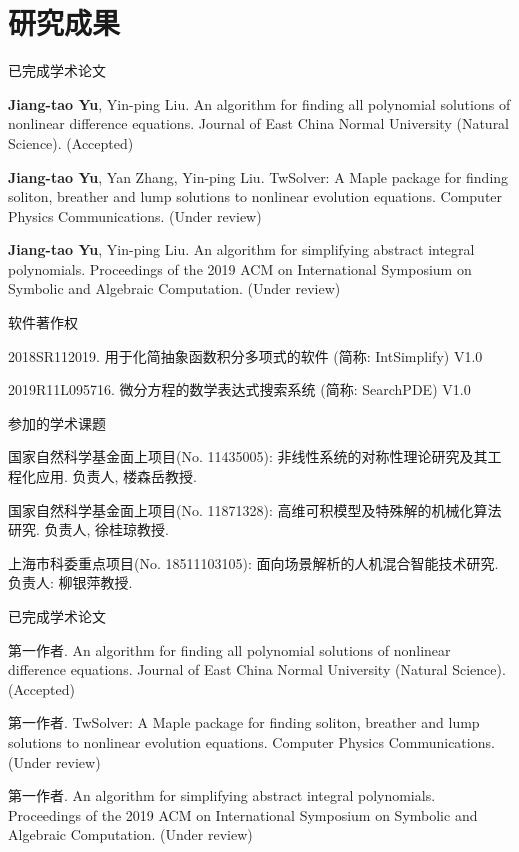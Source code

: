 \chapter*{研究成果}

\ifdefined\RELESE %

\noindent 已完成学术论文
\begin{enumerate}[label={[\arabic*]},leftmargin=*]
\item {\bf Jiang-tao Yu}, Yin-ping Liu. An algorithm for finding all polynomial
solutions of nonlinear difference equations. Journal of East China Normal University (Natural Science). (Accepted)
\item {\bf Jiang-tao Yu}, Yan Zhang, Yin-ping Liu. TwSolver: A Maple package for finding soliton, breather and lump solutions to nonlinear evolution equations. Computer Physics Communications. (Under review)
\item {\bf Jiang-tao Yu}, Yin-ping Liu. An algorithm for simplifying abstract integral polynomials. Proceedings of the 2019 ACM on International Symposium on Symbolic and Algebraic Computation. (Under review)
\end{enumerate}

\noindent 软件著作权
\begin{enumerate}[label={[\arabic*]},leftmargin=*]
\item 2018SR112019. 用于化简抽象函数积分多项式的软件 (简称: IntSimplify) V1.0
\item 2019R11L095716. 微分方程的数学表达式搜索系统 (简称: SearchPDE) V1.0
\end{enumerate}

\noindent 参加的学术课题
\begin{enumerate}[label={[\arabic*]},leftmargin=*]
\item 国家自然科学基金面上项目(No. 11435005): 非线性系统的对称性理论研究及其工程化应用. 负责人, 楼森岳教授.
\item 国家自然科学基金面上项目(No. 11871328): 高维可积模型及特殊解的机械化算法研究. 负责人, 徐桂琼教授.
\item 上海市科委重点项目(No. 18511103105): 面向场景解析的人机混合智能技术研究. 负责人: 柳银萍教授.
\end{enumerate}

\else %

\noindent 已完成学术论文
\begin{enumerate}[label={[\arabic*]},leftmargin=*]
\item 第一作者. An algorithm for finding all polynomial
solutions of nonlinear difference equations. Journal of East China Normal University (Natural Science). (Accepted)
\item 第一作者. TwSolver: A Maple package for finding soliton, breather and lump solutions to nonlinear evolution equations. Computer Physics Communications. (Under review)
\item 第一作者.  An algorithm for simplifying abstract integral polynomials. Proceedings of the 2019 ACM on International Symposium on Symbolic and Algebraic Computation. (Under review)
\end{enumerate}

